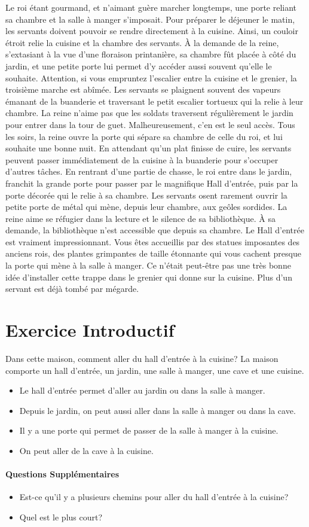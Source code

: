 \documentclass{article}
\begin{document}
Le roi étant gourmand, et n'aimant guère marcher longtemps, une porte reliant sa chambre et la salle à manger s'imposait.
Pour préparer le déjeuner le matin, les servants doivent pouvoir se rendre directement à la cuisine. Ainsi, un couloir étroit relie la cuisine et la chambre des servants.
À la demande de la reine, s'extasiant à la vue d'une floraison printanière, sa chambre fût placée à côté du jardin, et une petite porte lui permet d'y accéder aussi souvent qu'elle le souhaite.
Attention, si vous empruntez l'escalier entre la cuisine et le grenier, la troisième marche est abîmée.
Les servants se plaignent souvent des vapeurs émanant de la buanderie et traversant le petit escalier tortueux qui la relie à leur chambre.
La reine n'aime pas que les soldats traversent régulièrement le jardin pour entrer dans la tour de guet. Malheureusement, c'en est le seul accès.
Tous les soirs, la reine ouvre la porte qui sépare sa chambre de celle du roi, et lui souhaite une bonne nuit.
En attendant qu'un plat finisse de cuire, les servants peuvent passer immédiatement de la cuisine à la buanderie pour s'occuper d'autres tâches.
En rentrant d'une partie de chasse, le roi entre dans le jardin, franchit la grande porte pour passer par le magnifique Hall d'entrée, puis par la porte décorée qui le relie à sa chambre.
Les servants osent rarement ouvrir la petite porte de métal qui mène, depuis leur chambre, aux geôles sordides.
La reine aime se réfugier dans la lecture et le silence de sa bibliothèque. À sa demande, la bibliothèque n'est accessible que depuis sa chambre.
Le Hall d'entrée est vraiment impressionnant. Vous êtes accueillis par des statues imposantes des anciens rois, des plantes grimpantes de taille étonnante qui vous cachent presque la porte qui mène à la salle à manger.
Ce n'était peut-être pas une très bonne idée d'installer cette trappe dans le grenier qui donne sur la cuisine. Plus d'un servant est déjà tombé par mégarde.

\newpage
\section{Exercice Introductif}
Dans cette maison, comment aller du hall d'entrée à la cuisine?
La maison comporte un hall d'entrée, un jardin, une salle à manger, une cave et une cuisine.

\begin{itemize}
\item Le hall d'entrée permet d'aller au jardin ou dans la salle à manger.
\item Depuis le jardin, on peut aussi aller dans la salle à manger ou dans la cave.
\item Il y a une porte qui permet de passer de la salle à manger à la cuisine.
\item On peut aller de la cave à la cuisine.
\end{itemize}


\paragraph{Questions Supplémentaires}
\begin{itemize}
\item Est-ce qu'il y a plusieurs chemins pour aller du hall d'entrée à la cuisine?
\item Quel est le plus court?
\end{itemize}
\end{document}
